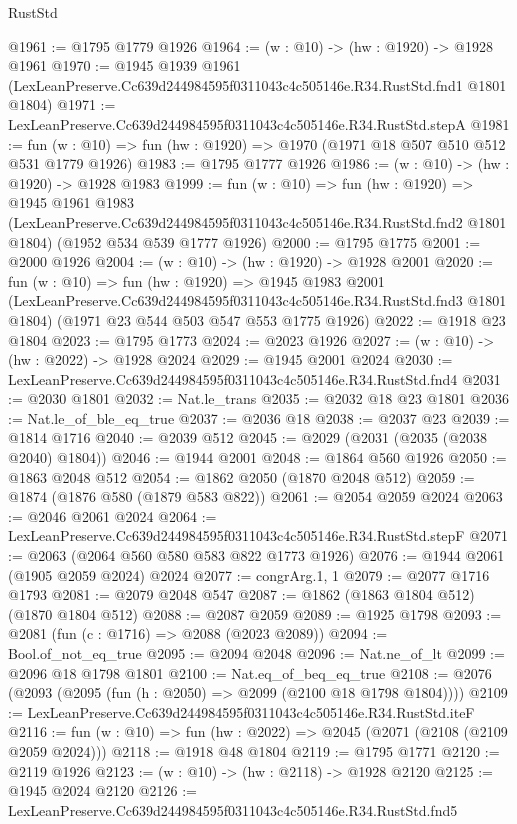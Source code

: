 \begin{lexlean}{RustStd}
\begin{coremodule}
@1961 := @1795 @1779 @1926
@1964 := (w : @10) -> (hw : @1920) -> @1928 @1961
@1970 := @1945
    @1939
    @1961
    (LexLeanPreserve.Cc639d244984595f0311043c4c505146e.R34.RustStd.fnd1 @1801 @1804)
@1971 := LexLeanPreserve.Cc639d244984595f0311043c4c505146e.R34.RustStd.stepA
@1981 := fun (w : @10) => fun (hw : @1920) => @1970 (@1971 @18 @507 @510 @512 @531 @1779 @1926)
@1983 := @1795 @1777 @1926
@1986 := (w : @10) -> (hw : @1920) -> @1928 @1983
@1999 := fun (w : @10) =>
  fun (hw : @1920) =>
  @1945
    @1961
    @1983
    (LexLeanPreserve.Cc639d244984595f0311043c4c505146e.R34.RustStd.fnd2 @1801 @1804)
    (@1952 @534 @539 @1777 @1926)
@2000 := @1795 @1775
@2001 := @2000 @1926
@2004 := (w : @10) -> (hw : @1920) -> @1928 @2001
@2020 := fun (w : @10) =>
  fun (hw : @1920) =>
  @1945
    @1983
    @2001
    (LexLeanPreserve.Cc639d244984595f0311043c4c505146e.R34.RustStd.fnd3 @1801 @1804)
    (@1971 @23 @544 @503 @547 @553 @1775 @1926)
@2022 := @1918 @23 @1804
@2023 := @1795 @1773
@2024 := @2023 @1926
@2027 := (w : @10) -> (hw : @2022) -> @1928 @2024
@2029 := @1945 @2001 @2024
@2030 := LexLeanPreserve.Cc639d244984595f0311043c4c505146e.R34.RustStd.fnd4
@2031 := @2030 @1801
@2032 := Nat.le_trans
@2035 := @2032 @18 @23 @1801
@2036 := Nat.le_of_ble_eq_true
@2037 := @2036 @18
@2038 := @2037 @23
@2039 := @1814 @1716
@2040 := @2039 @512
@2045 := @2029 (@2031 (@2035 (@2038 @2040) @1804))
@2046 := @1944 @2001
@2048 := @1864 @560 @1926
@2050 := @1863 @2048 @512
@2054 := @1862 @2050 (@1870 @2048 @512)
@2059 := @1874 (@1876 @580 (@1879 @583 @822))
@2061 := @2054 @2059 @2024
@2063 := @2046 @2061 @2024
@2064 := LexLeanPreserve.Cc639d244984595f0311043c4c505146e.R34.RustStd.stepF
@2071 := @2063 (@2064 @560 @580 @583 @822 @1773 @1926)
@2076 := @1944 @2061 (@1905 @2059 @2024) @2024
@2077 := congrArg.{1, 1}
@2079 := @2077 @1716 @1793
@2081 := @2079 @2048 @547
@2087 := @1862 (@1863 @1804 @512) (@1870 @1804 @512)
@2088 := @2087 @2059
@2089 := @1925 @1798
@2093 := @2081 (fun (c : @1716) => @2088 (@2023 @2089))
@2094 := Bool.of_not_eq_true
@2095 := @2094 @2048
@2096 := Nat.ne_of_lt
@2099 := @2096 @18 @1798 @1801
@2100 := Nat.eq_of_beq_eq_true
@2108 := @2076 (@2093 (@2095 (fun (h : @2050) => @2099 (@2100 @18 @1798 @1804))))
@2109 := LexLeanPreserve.Cc639d244984595f0311043c4c505146e.R34.RustStd.iteF
@2116 := fun (w : @10) => fun (hw : @2022) => @2045 (@2071 (@2108 (@2109 @2059 @2024)))
@2118 := @1918 @48 @1804
@2119 := @1795 @1771
@2120 := @2119 @1926
@2123 := (w : @10) -> (hw : @2118) -> @1928 @2120
@2125 := @1945 @2024 @2120
@2126 := LexLeanPreserve.Cc639d244984595f0311043c4c505146e.R34.RustStd.fnd5

\end{coremodule}
\end{lexlean}
